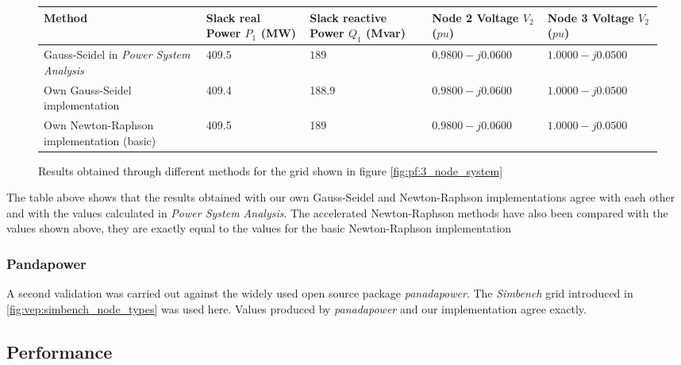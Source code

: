 \begin{figure}[H]
    \begin{center}
        \begin{tabular}{m{3cm} | m{2.5cm} m{2.5cm} m{2.5cm} m{2.5cm}}
            Method & Slack real Power $P_1$ (MW) & Slack reactive Power $Q_1$ (Mvar) & Node 2 Voltage $V_2$ ($pu$) & Node 3 Voltage $V_2$ ($pu$)\\
            \hline
            Gauss-Seidel in \textit{Power System Analysis}\autocite{power_system_analysis} & $409.5$ & $189$ & $0.9800 - j0.0600$ & $1.0000 - j0.0500$\\
            \hline
            Own Gauss-Seidel implementation & 409.4 & 188.9 & $0.9800-j0.0600$ & $1.0000 - j0.0500$ \\
            \hline
            Own Newton-Raphson implementation (basic) & 409.5 & 189 & $0.9800-j0.0600$ & $1.0000 - j0.0500$ \\
        \end{tabular}
    \end{center}
    \caption{Results obtained through different methods for the grid shown in figure \ref{fig:pf:3_node_system}}
\end{figure}

The table above shows that the results obtained with our own Gauss-Seidel and Newton-Raphson
implementations agree with each other and with the values calculated in \textit{Power System Analysis}\autocite{power_system_analysis}. The accelerated
Newton-Raphson methods have also been compared with the values shown above, they are exactly equal to the values 
for the basic Newton-Raphson implementation

\subsubsection{Pandapower}

A second validation was carried out against the widely used open source package
\textit{panadapower}\autocite{pandapower2018}. The \textit{Simbench} grid
introduced in \autoref{fig:vep:simbench_node_types} was used here. Values
produced by \textit{panadapower} and our implementation agree exactly.

\subsection{Performance}


